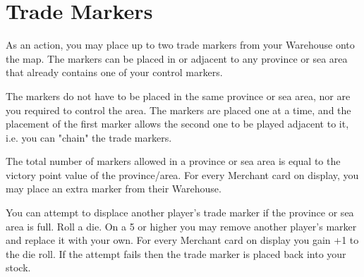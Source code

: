 \section{Trade Markers}

As an action, you may place up to two trade markers from your Warehouse onto the map. The markers can be placed in or adjacent to any province or sea area that already contains one of your control markers.

The markers do not have to be placed in the same province or sea area, nor are you required to control the area. The markers are placed one at a time, and the placement of the first marker allows the second one to be played adjacent to it, i.e. you can "chain" the trade markers.

The total number of markers allowed in a province or sea area is equal to the victory point value of the province/area. For every Merchant card on display, you may place an extra marker from their Warehouse.

You can attempt to displace another player’s trade marker if the province or sea area is full. Roll a die. On a 5 or higher you  may remove another player’s marker and replace it with your own. For every Merchant card on display you gain +1 to the die roll. If the attempt fails then the trade marker is placed back into your stock.